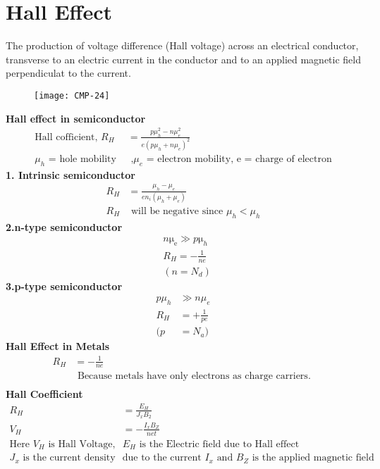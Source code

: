 \section{Hall Effect}
The production of voltage difference (Hall voltage) across an electrical conductor, transverse to an electric current in the conductor and to an applied magnetic field perpendiculat to the current.
\begin{figure}[H]
	\centering
	\texttt{[image: CMP-24]}
	\caption{}
	\label{}
\end{figure}
\textbf{Hall effect in semiconductor}
\begin{align*}
\text{Hall cofficient, } R_{H}&=\frac{p \mu_{h}^{2}-n \mu_{e}^{2}}{e\left(p \mu_{h}+n \mu_{e}\right)^{2}}\\
\text{$\mu_{h}$ = hole mobility }&\text{ ,$\mu_{e}$ = electron mobility, e = charge of electron}
\end{align*}
\textbf{1. Intrinsic semiconductor}
\begin{align*}
R_{H}&=\frac{\mu_{h}-\mu_{e}}{e n_{i}\left(\mu_{h}+\mu_{e}\right)}\\
R_{H} &\text{ will be negative since } \mu_{h} < \mu_{h}
\end{align*}
\textbf{2.n-type semiconductor}
\begin{align*}
&n \mathrm{\mu_e} \gg p \mathrm{\mu}_{h}\\
&R_{H}=-\frac{1}{ne}\\
&\left(n=N_{d}\right)
\end{align*}
\textbf{3.p-type semiconductor}
\begin{align*}
p \mu_{h} &\gg n \mu_{e}\\
R_{H}&=+\frac{1}{p e}\\
(p&=N_a)
\end{align*}
\textbf{Hall Effect in Metals}
\begin{align*}
R_{H}&=-\frac{1}{n e}\\
&\text { Because } \text {metals have only  electrons as charge carriers. }\\
\end{align*}
\textbf{Hall Coefficient}
\begin{align*}
R_{H}&=\frac{E_{H}}{J_{x} B_{2}}\\
V_{H}&=-\frac{I_{x} B_{Z}}{n e t}\\
\text{Here $V_{H}$ is Hall Voltage, }&\text{$E_{H}$ is the Electric field due to Hall effect}
\\ \text{$J_{x}$ is the current density }&\text{due to the current $I_{x}$ and $B_{Z}$ is the applied magnetic field}
\end{align*}
